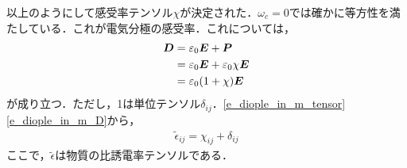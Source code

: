 以上のようにして感受率テンソル$\chi$が決定された．$\omega_c=0$では確かに等方性を満たしている．これが電気分極の感受率．これについては，
\begin{align}
  \boldsymbol{D} &= \varepsilon_0\boldsymbol{E}+\boldsymbol{P}\notag \\
  &= \varepsilon_0\boldsymbol{E}+\varepsilon_0\chi\boldsymbol{E}\notag \\
  &= \varepsilon_0(1+\chi)\boldsymbol{E} \label{e_diople_in_m_D}
\end{align}
が成り立つ．ただし，1は単位テンソル$\delta_{ij}$．\eqref{e_diople_in_m_tensor}\eqref{e_diople_in_m_D}から，
\begin{align}
  \tilde{\epsilon}_{ij}=\chi_{ij}+\delta_{ij}
\end{align}
ここで，$\tilde{\epsilon}$は物質の比誘電率テンソルである．

